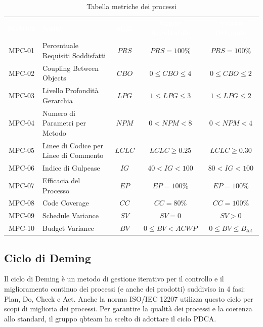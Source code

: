     \renewcommand{\arraystretch}{1.5}
    \begin{longtable}{ c C{4cm} c c c}
    \caption{Tabella metriche dei processi}\\
    \textcolor{white}{\textbf{Metrica}} & \textcolor{white}{\textbf{Nome}} & \textcolor{white}{\textbf{Sigla}} & \textcolor{white}{\textbf{Valore Accettabile}} & \textcolor{white}{\textbf{Valore Ottimale}}\\
    MPC-01 & Percentuale Requisiti Soddisfatti & $PRS$ & $PRS=100\%$ & $PRS=100\%$ \\
    MPC-02 & Coupling Between Objects & $CBO$ & $0 \leq CBO \leq 4$ & $0 \leq CBO \leq 2$ \\
    MPC-03 & Livello Profondità Gerarchia & $LPG$ &  $1 \leq LPG \leq 3$ &  $1 \leq LPG \leq 2$ \\
    MPC-04 & Numero di Parametri per Metodo & $NPM$ & $0 < NPM < 8$ & $ 0 < NPM < 4$ \\
    MPC-05 & Linee di Codice per Linee di Commento & $LCLC$ & $LCLC \geq 0.25$ & $LCLC \geq 0.30$ \\
    MPC-06 & Indice di Gulpease & $IG$ & $40 < IG < 100$ & $80 < IG < 100$ \\
    MPC-07 & Efficacia del Processo & $EP$ & $EP = 100\%$ & $EP = 100\%$ \\
    MPC-08 & Code Coverage & $CC$ & $CC = 80\%$ & $CC = 100\%$  \\
    MPC-09 & Schedule Variance & $SV$ & $SV = 0$ & $SV > 0$  \\	
    MPC-10 & Budget Variance & $BV$ & $0 \leq BV < ACWP$ & $0 \leq BV \leq B_{tot}$  \\
    \end{longtable}

\subsection{Ciclo di Deming}
    Il ciclo di Deming è un metodo di gestione iterativo per il controllo e il miglioramento continuo dei processi (e anche dei prodotti) suddiviso in 4 fasi: Plan, Do, Check e Act. 
    Anche la norma ISO/IEC 12207 utilizza questo ciclo per scopi di miglioria dei processi. Per garantire la qualità dei processi e la coerenza allo standard, il gruppo qbteam 
    ha scelto di adottare il ciclo PDCA.

